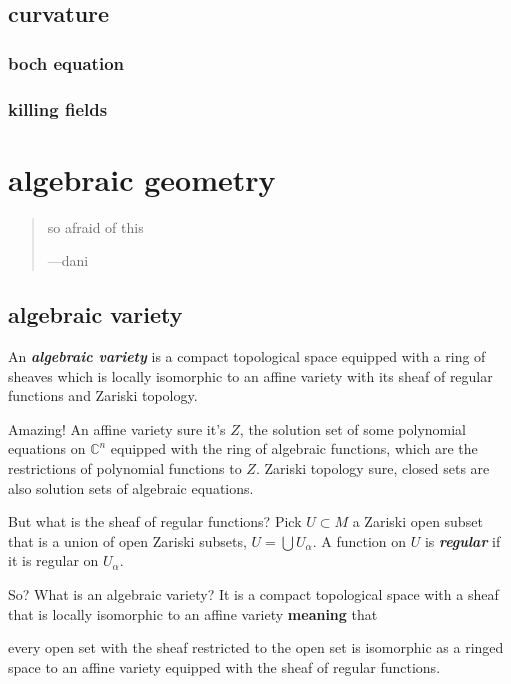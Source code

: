 \subsection{curvature}

\subsubsection{boch equation}

\subsubsection{killing fields}




\section{algebraic geometry}
\vspace{1em}
\begin{quotation}
so afraid of this

\hfill ---dani
\end{quotation}
\vspace{2em}
\subsection{algebraic variety}

An \textit{\textbf{algebraic variety}} is a compact topological space equipped with a ring of sheaves which is locally isomorphic to an affine variety with its sheaf of regular functions and Zariski topology.

Amazing! An affine variety sure it's \(Z\), the solution set of some polynomial equations on \(\mathbb{C}^n\) equipped with the ring of algebraic functions, which are the restrictions of polynomial functions to \(Z\). Zariski topology sure, closed sets are also solution sets of algebraic equations.

But what is the sheaf of regular functions? Pick \(U \subset M\) a Zariski open subset that is a union of open Zariski subsets, \(U=\bigcup U_\alpha\). A function on \(U\) is \textit{\textbf{regular}} if it is regular on \(U_\alpha\).

So? What is an algebraic variety? It is a compact topological space with a sheaf that is locally isomorphic to an affine variety \textbf{meaning} that 

\begin{tcolorbox}[colback=white,colframe=black,boxrule=0.5pt,sharp corners]
every open set with the sheaf restricted to the open set is isomorphic as a ringed space to an affine variety equipped with the sheaf of regular functions.
\end{tcolorbox}

